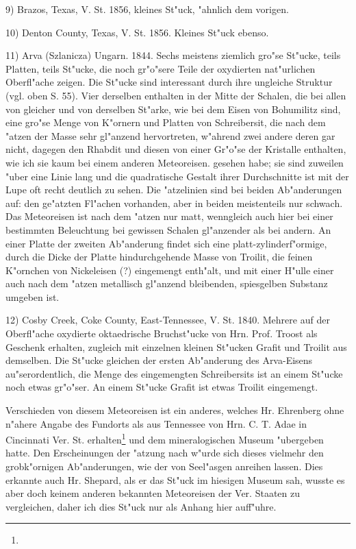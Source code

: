 \documentclass[a4paper, 11pt, oneside]{article}
\begin{document}
9) Brazos, Texas, V. St. 1856, kleines St"uck, "ahnlich dem vorigen.

10) Denton County, Texas, V. St. 1856. Kleines St"uck ebenso.

11) Arva (Szlanicza) Ungarn. 1844. Sechs meistens ziemlich gro"se St"ucke, teils Platten, teils St"ucke, die noch gr"o"sere Teile der oxydierten nat"urlichen Oberfl"ache zeigen. Die St"ucke sind interessant durch ihre ungleiche Struktur (vgl. oben S. 55). Vier derselben enthalten in der Mitte der Schalen, die bei allen von gleicher und von derselben St"arke, wie bei dem Eisen von Bohumilitz sind, eine gro"se Menge von K"ornern und Platten von Schreibersit, die nach dem "atzen der Masse sehr gl"anzend hervortreten, w"ahrend zwei andere deren gar nicht, dagegen den Rhabdit und diesen von einer Gr"o"se der Kristalle enthalten, wie ich sie kaum bei einem anderen Meteoreisen. gesehen habe; sie sind zuweilen "uber eine Linie lang und die quadratische Gestalt ihrer Durchschnitte ist mit der Lupe oft recht deutlich zu sehen. Die "atzelinien sind bei beiden Ab"anderungen auf: den ge"atzten Fl"achen vorhanden, aber in beiden meistenteils nur schwach. Das Meteoreisen ist nach dem "atzen nur matt, wenngleich auch hier bei einer bestimmten Beleuchtung bei gewissen Schalen gl"anzender als bei andern. An einer Platte der zweiten Ab"anderung findet sich eine platt-zylinderf"ormige, durch die Dicke der Platte hindurchgehende Masse von Troilit, die feinen K"ornchen von Nickeleisen (?) eingemengt enth"alt, und mit einer H"ulle einer auch nach dem "atzen metallisch gl"anzend bleibenden, spiesgelben Substanz umgeben ist.

12) Cosby Creek, Coke County, East-Tennessee, V. St. 1840. Mehrere auf der Oberfl"ache oxydierte oktaedrische Bruchst"ucke von Hrn. Prof. Troost als Geschenk erhalten, zugleich mit einzelnen kleinen St"ucken Grafit und Troilit aus demselben. Die St"ucke gleichen der ersten Ab"anderung des Arva-Eisens au"serordentlich, die Menge des eingemengten Schreibersits ist an einem St"ucke noch etwas gr"o"ser. An einem St"ucke Grafit ist etwas Troilit eingemengt.

Verschieden von diesem Meteoreisen ist ein anderes, welches Hr. Ehrenberg ohne n"ahere Angabe des Fundorts als aus Tennessee von Hrn. C. T. Adae in Cincinnati Ver. St. erhalten\footnote{} und dem mineralogischen Museum "ubergeben hatte. Den Erscheinungen der "atzung nach w"urde sich dieses vielmehr den grobk"ornigen Ab"anderungen, wie der von Seel"asgen anreihen lassen. Dies erkannte auch Hr. Shepard, als er das St"uck im hiesigen Museum sah, wusste es aber doch keinem anderen bekannten Meteoreisen der Ver. Staaten zu vergleichen, daher ich dies St"uck nur als Anhang hier auff"uhre.
\end{document}
